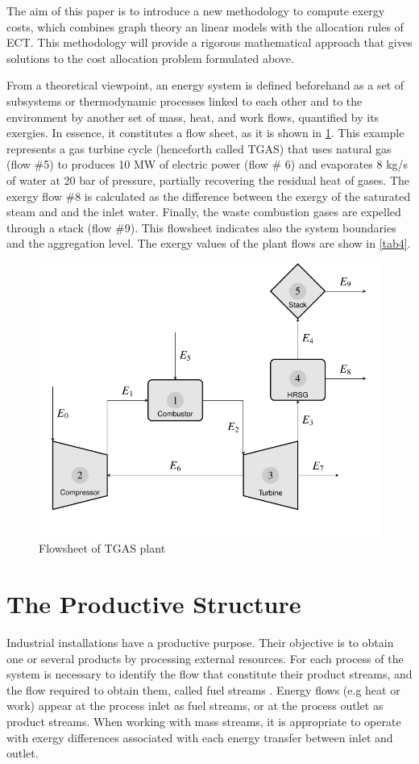 \documentclass{ecos2018}
\begin{document}
The aim of this paper is to introduce a new methodology to compute exergy costs, which combines graph theory an linear models with the allocation rules of ECT. This methodology will provide a rigorous mathematical approach that gives solutions to the cost allocation problem formulated above.

From a theoretical viewpoint, an energy system is defined beforehand as a set of subsystems or thermodynamic processes linked to each other and to the environment by another set of mass, heat, and work flows, quantified by its exergies. In essence, it constitutes a flow sheet, as it is shown in \cref{fig1}. This example represents a gas turbine cycle (henceforth called TGAS) that uses natural gas (flow \#5) to produces 10 MW of electric power (flow \# 6) and evaporates 8 kg/s of water at 20 bar of pressure, partially recovering the residual heat of gases. The exergy flow \#8 is calculated as the difference between the exergy of the saturated steam and and the inlet water. Finally, the waste combustion gases are expelled through a stack (flow \#9). This flowsheet indicates also the system boundaries and the aggregation level. The exergy values of the plant flows are show in \cref{tab4}.

\begin{figure}[h]
	\centering
	\includegraphics[width=0.65\linewidth]{tgas.pdf}
	\caption{Flowsheet of TGAS plant}
	\label{fig1}
\end{figure}

\section{The Productive Structure}
Industrial installations have a productive purpose. Their objective is to obtain one or several products by processing external resources. For each process of the system is necessary to identify the flow that constitute their product streams, and the flow  required to obtain them, called fuel streams \cite{Tsatsaronis1985,SPECO06}. Energy flows (e.g heat or work) appear at the process inlet as fuel streams, or at the process outlet as product streams. When working with mass streams, it is appropriate to operate with exergy differences associated with each energy transfer between inlet and outlet.
\end{document}
